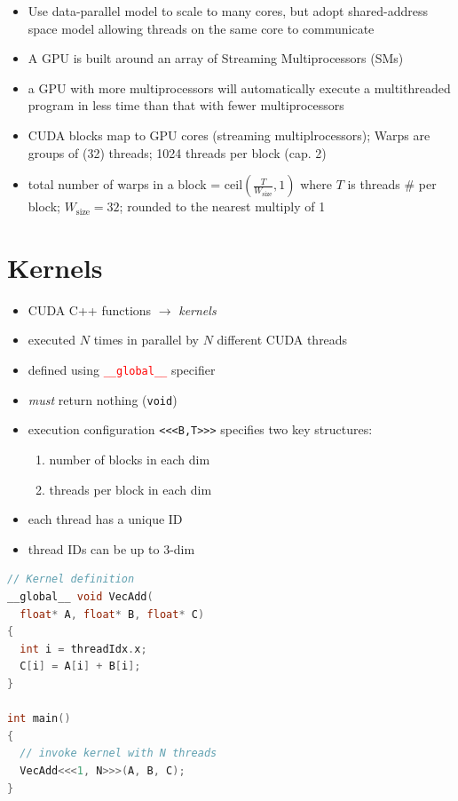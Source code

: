 \begin{itemize}
\item Use data-parallel model to scale to many cores, but adopt shared-address space model allowing threads on the same core to communicate
\item A GPU is built around an array of Streaming Multiprocessors (SMs)
\item a GPU with more multiprocessors will automatically execute a multithreaded program in less time than that with fewer multiprocessors
\item CUDA blocks map to GPU cores (streaming multiplrocessors); Warps are groups of (32) threads; 1024 threads per block (cap. 2)
\item total number of warps in a block = ceil$(\frac{T}{W_{\text{size}}},1)$ where $T$ is threads $\#$ per block; $W_{\text{size}} = 32$; rounded to the nearest multiply of 1
\end{itemize}
\begin{minipage}{0.5\linewidth}
  \section*{Kernels}
  \flushleft
  \begin{itemize}
  \item CUDA C++ functions $\to$ \emph{kernels}
  \item executed $N$ times in parallel by $N$ different CUDA threads
  \item defined using \textcolor{Red}{\texttt{\_\_global\_\_}} specifier
  \item \emph{must} return nothing (\texttt{void})
  \item execution configuration \texttt{<<<B,T>>>} specifies two key structures:
    \begin{enumerate}
    \item number of blocks in each dim
    \item threads per block in each dim
    \end{enumerate}
  \item each thread has a unique ID
  \item thread IDs can be up to 3-dim
  \end{itemize}
\end{minipage}
\begin{minipage}{0.5\linewidth}
\begin{lstlisting}[language=C++,xleftmargin=1pt]
// Kernel definition
__global__ void VecAdd(
  float* A, float* B, float* C)
{
  int i = threadIdx.x;
  C[i] = A[i] + B[i];
}

int main()
{
  // invoke kernel with N threads
  VecAdd<<<1, N>>>(A, B, C);
}
\end{lstlisting}
\end{minipage}
